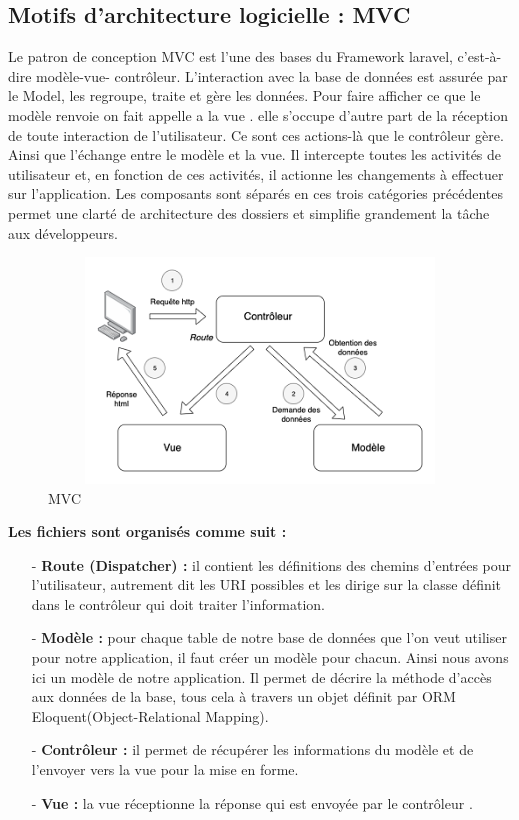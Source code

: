 \subsection{Motifs d’architecture logicielle : MVC}
Le patron de conception MVC est l’une des bases du Framework
laravel, c’est-à-dire modèle-vue- contrôleur. L’interaction avec la
base de données est assurée par le Model, les regroupe, traite et
gère les données.
Pour faire afficher ce que le modèle renvoie on fait appelle a la vue .
elle s’occupe d’autre part de la réception de toute interaction de
l’utilisateur. Ce sont ces actions-là que le contrôleur gère.
Ainsi que l’échange entre le modèle et la vue. Il intercepte toutes les
activités de utilisateur et, en fonction de ces activités, il actionne les
changements à effectuer sur l'application.
Les composants sont séparés en ces trois catégories précédentes
permet une clarté de architecture des dossiers et simplifie
grandement la tâche aux développeurs.
\begin{figure}[h!]
	\includegraphics[width=15cm, height=6cm]{./Template LaTeX/Images/Modèle-vue-contrôleur_(MVC)_-_fr.png}
	\caption{MVC}
	\label{fig:birds}
\end{figure}
\newline \newline \newline
\textbf{Les fichiers sont organisés comme suit :}
\begin{enumerate}
	\item [-] \textbf{Route (Dispatcher) : }il contient les définitions des chemins d’entrées pour l’utilisateur,
	autrement dit les URI possibles et les dirige sur la classe définit dans
	le contrôleur qui doit traiter l’information.
	\item [-] \textbf{ Modèle : }pour chaque table de notre base de données que l’on veut
	utiliser pour notre application, il faut créer un modèle pour chacun.
	Ainsi nous avons ici un modèle de notre application. Il permet de
	décrire la méthode d’accès aux données de la base, tous cela à
	travers un objet définit par ORM Eloquent(Object-Relational
	Mapping).
	\item [-] \textbf{Contrôleur : } il permet de récupérer les informations du modèle et de l’envoyer
	vers la vue pour la mise en forme.
	\item [-] \textbf{Vue : } la vue réceptionne la réponse qui est envoyée par le
	contrôleur .\newline
\end{enumerate}

